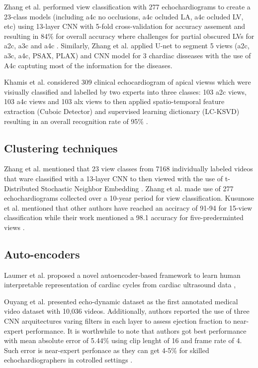 Zhang et al. performed view classification with 277 echochardiograms to create a 23-class models (including a4c no occlusions, a4c ocluded LA, a4c ocluded LV, etc) using 13-layer CNN with 5-fold cross-validation for accuracy assement and resulting in 84\% for overall accuracy where challenges for partial obscured LVs for a2c, a3c and a4c \cite{zhang2018}.
Similarly, Zhang et al. applied U-net to segment 5 views (a2c, a3c, a4c, PSAX, PLAX) and CNN model for 3 chardiac disseases with the use of A4c captuting most of the information for the diseases.

Khamis et al. considered 309 clinical echocardiogram of apical viewss which were visiually classified and labelled by two experts into three classes: 103 a2c views, 103 a4c views and 103 alx views to then applied spatio-temporal feature extraction (Cuboic Detector) and supervised learning dictionary (LC-KSVD) resulting in an overall recognition rate of 95\% \cite{khamis2017}.

\subsection{Clustering techniques}
Zhang et al. mentioned that 23 view classes from 7168 individually labeled videos that ware classified with a 13-layer CNN to then viewed with the use of t-Distributed Stochastic Neighbor Embedding \cite{zhang2018}.
Zhang et al. made use of 277 echochardiograms collected over a 10-year period for view classification.
Kusunose et al. mentioned that other authors have reached an acciracy of 91-94 for 15-view classification while their work mentioned a 98.1 accuracy for five-prederminted views \cite{kusunose2021}.

\subsection{Auto-encoders}
Laumer et al. proposed a novel autoencoder-based framework to learn human interpretable representation of cardiac cycles from cardiac ultrasound data \cite{laumer2020},

Ouyang et al. presented echo-dynamic dataset as the first annotated medical video dataset with 10,036 videos. 
Additionally, authors reported the use of three CNN arquitectures varing filters in each layer to assess ejection fraction to near-expert performance.
It is worthwhile to note that authors got best performance with mean absolute error of 5.44\% using clip lenght of 16 and frame rate of 4.
Such error is near-expert perfonace as they can get 4-5\% for skilled echochardiographers in cotrolled settings \cite{ouyang-NeuripsML4H2019}.



